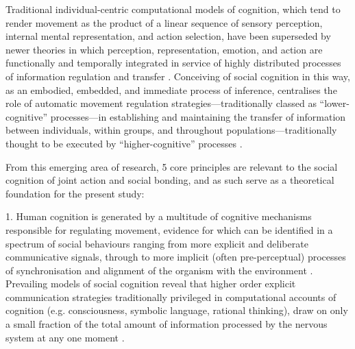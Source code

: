 \begin{CJK}{UTF8}{gbsn}
{Traditional individual-centric computational models of cognition, which tend to render movement as the product of a linear sequence of sensory perception, internal mental representation, and action selection, have been superseded by newer theories in which perception, representation, emotion, and action are functionally and temporally integrated in service of highly distributed processes of information regulation and transfer \citep{Clark2013}.  Conceiving of social cognition in this way, as an embodied, embedded, and immediate process of inference, centralises the role of automatic movement regulation strategies---traditionally classed as ``lower-cognitive'' processes---in establishing and maintaining the transfer of information between individuals, within groups, and throughout populations---traditionally thought to be executed by  ``higher-cognitive'' processes \citep{Claidiere2014}.



From this emerging area of research, 5 core principles are relevant to the social cognition of joint action and social bonding, and as such serve as a theoretical foundation for the present study:

1. Human cognition is generated by a multitude of cognitive mechanisms responsible for regulating movement, evidence for which can be identified in a spectrum of social behaviours ranging from more explicit and deliberate communicative signals, through to more implicit (often pre-perceptual) processes of synchronisation and alignment of the organism with the environment \citep{Frith2010,Semin2008}. Prevailing models of social cognition reveal that higher order explicit communication strategies traditionally privileged in computational accounts of cognition (e.g. consciousness, symbolic language, rational thinking), draw on only a small fraction of the total amount of information processed by the nervous system at any one moment \citep{Semin2012}.

}
\end{CJK}
